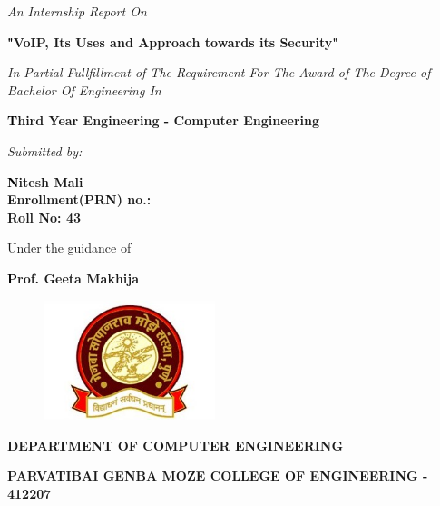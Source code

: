 \thispagestyle{empty}
\centering
\vspace{0.5\baselineskip}
    {\normalsize \textit{An Internship Report On} \par}
\vspace{0.5\baselineskip}
     \Large {\bfseries \textcolor{black}"VoIP, Its Uses and Approach
towards its Security" \par}
\vspace{0.5\baselineskip}
    {\normalsize \textit{In Partial Fullfillment of The Requirement For The Award of The Degree of Bachelor Of Engineering In} \par}
\vspace{0.5\baselineskip}
    {\large \bf \textcolor{black}Third Year Engineering - Computer Engineering\par} 
\vspace{0.5\baselineskip}
    {\normalsize \textit{Submitted by:} \par}
\vspace{0.5\baselineskip}
    {{\large {\bf \textcolor{black}Nitesh Mali \\ Enrollment(PRN) no.: \myrollno \\ Roll No: 43}} \par}
\vspace{1.5\baselineskip}
    {Under the guidance of \par}
\vspace{0.5\baselineskip}
    {\large \bf \textcolor{black}Prof. Geeta Makhija \par}
\vspace{0.5\baselineskip}
    {\begin{figure}[!h] 
	\centering
	\includegraphics[width=50mm]{Media/Logo/logo_utp.jpg} 
     \end{figure}
    }
\vspace{1\baselineskip}
    {\small \bf DEPARTMENT OF \MakeUppercase{Computer Engineering} \par}
\vspace*{0.5ex}
    {\small \bf \uppercase{Parvatibai Genba Moze College of Engineering - 412207} \par}
\vspace{0.25\baselineskip}
